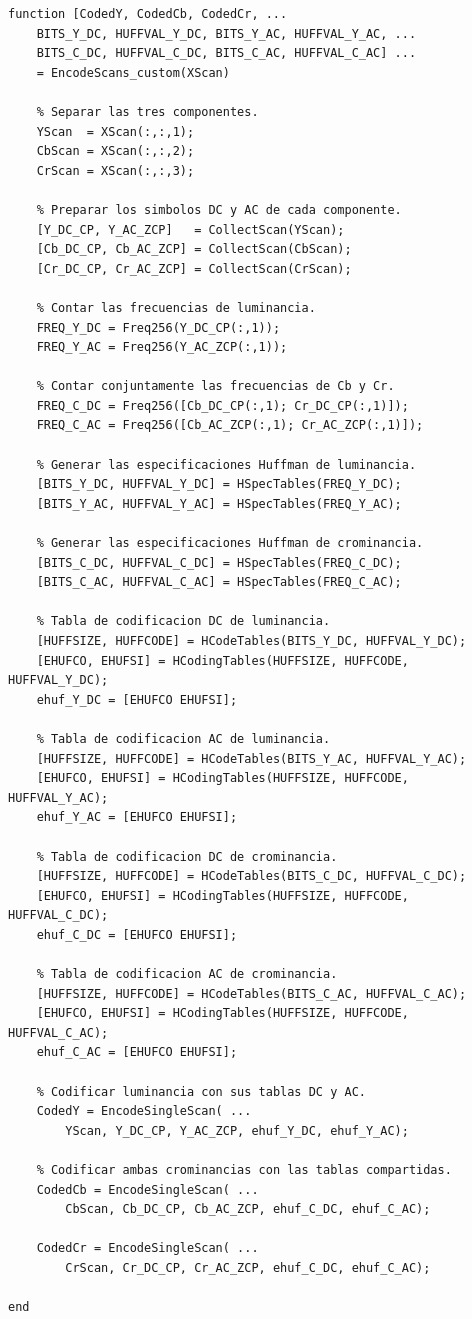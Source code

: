 \documentclass[11pt,a4paper,oneside]{report}
\begin{document}
\begin{lstlisting}
function [CodedY, CodedCb, CodedCr, ...
    BITS_Y_DC, HUFFVAL_Y_DC, BITS_Y_AC, HUFFVAL_Y_AC, ...
    BITS_C_DC, HUFFVAL_C_DC, BITS_C_AC, HUFFVAL_C_AC] ...
    = EncodeScans_custom(XScan)

    % Separar las tres componentes.
    YScan  = XScan(:,:,1);
    CbScan = XScan(:,:,2);
    CrScan = XScan(:,:,3);

    % Preparar los simbolos DC y AC de cada componente.
    [Y_DC_CP, Y_AC_ZCP]   = CollectScan(YScan);
    [Cb_DC_CP, Cb_AC_ZCP] = CollectScan(CbScan);
    [Cr_DC_CP, Cr_AC_ZCP] = CollectScan(CrScan);

    % Contar las frecuencias de luminancia.
    FREQ_Y_DC = Freq256(Y_DC_CP(:,1));
    FREQ_Y_AC = Freq256(Y_AC_ZCP(:,1));

    % Contar conjuntamente las frecuencias de Cb y Cr.
    FREQ_C_DC = Freq256([Cb_DC_CP(:,1); Cr_DC_CP(:,1)]);
    FREQ_C_AC = Freq256([Cb_AC_ZCP(:,1); Cr_AC_ZCP(:,1)]);

    % Generar las especificaciones Huffman de luminancia.
    [BITS_Y_DC, HUFFVAL_Y_DC] = HSpecTables(FREQ_Y_DC);
    [BITS_Y_AC, HUFFVAL_Y_AC] = HSpecTables(FREQ_Y_AC);

    % Generar las especificaciones Huffman de crominancia.
    [BITS_C_DC, HUFFVAL_C_DC] = HSpecTables(FREQ_C_DC);
    [BITS_C_AC, HUFFVAL_C_AC] = HSpecTables(FREQ_C_AC);

    % Tabla de codificacion DC de luminancia.
    [HUFFSIZE, HUFFCODE] = HCodeTables(BITS_Y_DC, HUFFVAL_Y_DC);
    [EHUFCO, EHUFSI] = HCodingTables(HUFFSIZE, HUFFCODE, HUFFVAL_Y_DC);
    ehuf_Y_DC = [EHUFCO EHUFSI];

    % Tabla de codificacion AC de luminancia.
    [HUFFSIZE, HUFFCODE] = HCodeTables(BITS_Y_AC, HUFFVAL_Y_AC);
    [EHUFCO, EHUFSI] = HCodingTables(HUFFSIZE, HUFFCODE, HUFFVAL_Y_AC);
    ehuf_Y_AC = [EHUFCO EHUFSI];

    % Tabla de codificacion DC de crominancia.
    [HUFFSIZE, HUFFCODE] = HCodeTables(BITS_C_DC, HUFFVAL_C_DC);
    [EHUFCO, EHUFSI] = HCodingTables(HUFFSIZE, HUFFCODE, HUFFVAL_C_DC);
    ehuf_C_DC = [EHUFCO EHUFSI];

    % Tabla de codificacion AC de crominancia.
    [HUFFSIZE, HUFFCODE] = HCodeTables(BITS_C_AC, HUFFVAL_C_AC);
    [EHUFCO, EHUFSI] = HCodingTables(HUFFSIZE, HUFFCODE, HUFFVAL_C_AC);
    ehuf_C_AC = [EHUFCO EHUFSI];

    % Codificar luminancia con sus tablas DC y AC.
    CodedY = EncodeSingleScan( ...
        YScan, Y_DC_CP, Y_AC_ZCP, ehuf_Y_DC, ehuf_Y_AC);

    % Codificar ambas crominancias con las tablas compartidas.
    CodedCb = EncodeSingleScan( ...
        CbScan, Cb_DC_CP, Cb_AC_ZCP, ehuf_C_DC, ehuf_C_AC);

    CodedCr = EncodeSingleScan( ...
        CrScan, Cr_DC_CP, Cr_AC_ZCP, ehuf_C_DC, ehuf_C_AC);

end
\end{lstlisting}
\end{document}
